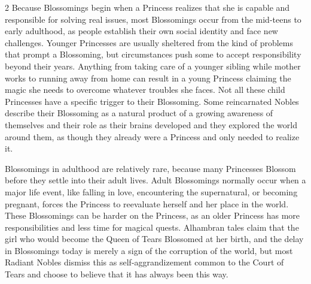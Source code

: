 \begin{multicols}{2}
Because Blossomings begin when a Princess realizes that she is capable and responsible for solving real issues, most Blossomings occur from the mid-teens to early adulthood, as people establish their own social identity and face new challenges. Younger Princesses are usually sheltered from the kind of problems that prompt a Blossoming, but circumstances push some to accept responsibility beyond their years. Anything from taking care of a younger sibling while mother works to running away from home can result in a young Princess claiming the magic she needs to overcome whatever troubles she faces. Not all these child Princesses have a specific trigger to their Blossoming. Some reincarnated Nobles describe their Blossoming as a natural product of a growing awareness of themselves and their role as their brains developed and they explored the world around them, as though they already were a Princess and only needed to realize it. 

Blossomings in adulthood are relatively rare, because many Princesses Blossom before they settle into their adult lives. Adult Blossomings normally occur when a major life event, like falling in love, encountering the supernatural, or becoming pregnant, forces the Princess to reevaluate herself and her place in the world. These Blossomings can be harder on the Princess, as an older Princess has more responsibilities and less time for magical quests. Alhambran tales claim that the girl who would become the Queen of Tears Blossomed at her birth, and the delay in Blossomings today is merely a sign of the corruption of the world, but most Radiant Nobles dismiss this as self-aggrandizement common to the Court of Tears and choose to believe that it has always been this way. 
 
 


\end{multicols}
